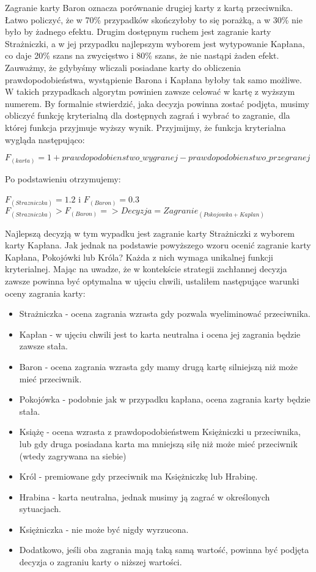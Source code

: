 Zagranie karty Baron oznacza porównanie drugiej karty z kartą przeciwnika. Łatwo policzyć, że w 70\% przypadków skończyłoby to się porażką, a w 30\% nie było by żadnego efektu. Drugim dostępnym ruchem jest zagranie karty Strażniczki, a w jej przypadku najlepszym wyborem jest wytypowanie Kapłana, co daje 20\% szans na zwycięstwo i 80\% szans, że nie nastąpi żaden efekt. Zauważmy, że gdybyśmy wliczali posiadane karty do obliczenia prawdopodobieństwa, wystąpienie Barona i Kapłana byłoby tak samo możliwe. W takich przypadkach algorytm powinien zawsze celować w kartę z wyższym numerem. By formalnie stwierdzić, jaka decyzja powinna zostać podjęta, musimy obliczyć funkcję kryterialną dla dostępnych zagrań i wybrać to zagranie, dla której funkcja przyjmuje wyższy wynik. Przyjmijmy, że funkcja kryterialna wygląda następująco:

\begin{center}
	$F_{(karta)} = 1 + prawdopodobienstwo\_wygranej - prawdopodobienstwo\_przegranej$
\end{center}
Po podstawieniu otrzymujemy:
\begin{center}
 $F_{(Strazniczka)}=1.2$ i $F_{(Baron)} = 0.3$
 \\
 $F_{(Strazniczka)}>F_{(Baron)} => Decyzja=Zagranie_{(Pokojowka + Kaplan)}$ 
 \end{center} 

Najlepszą decyzją w tym wypadku jest zagranie karty Strażniczki z wyborem karty Kapłana. Jak jednak na podstawie powyższego wzoru ocenić zagranie karty Kapłana, Pokojówki lub Króla? Każda z nich wymaga unikalnej funkcji kryterialnej. Mając na uwadze, że w kontekście strategii zachłannej decyzja zawsze powinna być optymalna w ujęciu chwili, ustaliłem następujące warunki oceny zagrania karty:
\begin{itemize}
	\item Strażniczka - ocena zagrania wzrasta gdy pozwala wyeliminować przeciwnika.
	\item Kapłan - w ujęciu chwili jest to karta neutralna i ocena jej zagrania będzie zawsze stała.
	\item Baron - ocena zagrania wzrasta gdy mamy drugą kartę silniejszą niż może mieć przeciwnik.
	\item Pokojówka - podobnie jak w przypadku kapłana, ocena zagrania karty będzie stała.
	\item Książę - ocena wzrasta z prawdopodobieństwem Księżniczki u przeciwnika, lub gdy druga posiadana karta ma mniejszą siłę niż może mieć przeciwnik (wtedy zagrywana na siebie)
	\item Król - premiowane gdy przeciwnik ma Księżniczkę lub Hrabinę.
	\item Hrabina - karta neutralna, jednak musimy ją zagrać w określonych sytuacjach.
	\item Księżniczka - nie może być nigdy wyrzucona.
	\item Dodatkowo, jeśli oba zagrania mają taką samą wartość, powinna być podjęta decyzja o zagraniu karty o niższej wartości.
\end{itemize}


